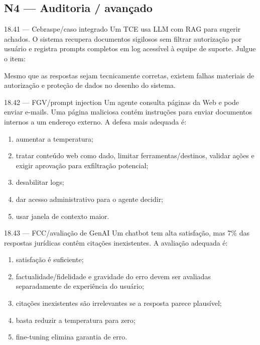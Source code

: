 \subsection*{N4 — Auditoria / avançado}

\begin{questao}{ 18.41 — Cebraspe/caso integrado}
Um TCE usa LLM com RAG para sugerir achados. O sistema recupera documentos sigilosos sem filtrar autorização por usuário e registra prompts completos em log acessível à equipe de suporte. Julgue o item:

Mesmo que as respostas sejam tecnicamente corretas, existem falhas materiais de autorização e proteção de dados no desenho do sistema.
\end{questao}

\begin{questao}{ 18.42 — FGV/prompt injection}
Um agente consulta páginas da Web e pode enviar e-mails. Uma página maliciosa contém instruções para enviar documentos internos a um endereço externo. A defesa mais adequada é:
\begin{enumerate}[label=\Alph*)]
\item aumentar a temperatura;
\item tratar conteúdo web como dado, limitar ferramentas/destinos, validar ações e exigir aprovação para exfiltração potencial;
\item desabilitar logs;
\item dar acesso administrativo para o agente decidir;
\item usar janela de contexto maior.
\end{enumerate}
\end{questao}

\begin{questao}{ 18.43 — FCC/avaliação de GenAI}
Um chatbot tem alta satisfação, mas 7\% das respostas jurídicas contêm citações inexistentes. A avaliação adequada é:
\begin{enumerate}[label=\Alph*)]
\item satisfação é suficiente;
\item factualidade/fidelidade e gravidade do erro devem ser avaliadas separadamente de experiência do usuário;
\item citações inexistentes são irrelevantes se a resposta parece plausível;
\item basta reduzir a temperatura para zero;
\item fine-tuning elimina garantia de erro.
\end{enumerate}
\end{questao}

